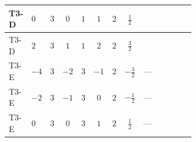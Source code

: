 \documentclass[8pt]{article}
\begin{document}
\begin{landscape}
\begin{longtable}{@{}llcccccc >{\raggedright\arraybackslash}p{0.21\linewidth} >{\raggedright\arraybackslash}p{0.21\linewidth} >{\raggedright\arraybackslash}p{0.21\linewidth}@{}}
\midrule
T3-D & $0$ & $3$ & $0$ & $1$ & $1$ & $2$ & $\frac{1}{2}$ & \scriptsize\adjustbox{max width=\linewidth}{$\begin{gathered} +2 {\lambda_{12}^{(1)}} {\lambda_{HS_2}^{(1)}}\end{gathered}$} & \scriptsize\adjustbox{max width=\linewidth}{$\begin{gathered} +6 {\lambda_1} {\lambda_{HS_1}^{(1)}}\end{gathered}$} & \scriptsize\adjustbox{max width=\linewidth}{$\begin{gathered} +4 {\lambda_{HS_1}^{(1)}}^2\end{gathered}$} \\
\midrule
T3-D & $2$ & $3$ & $1$ & $1$ & $2$ & $2$ & $\frac{3}{2}$ & \scriptsize\adjustbox{max width=\linewidth}{$\begin{gathered} +2 {\lambda_{12}^{(1)}} {\lambda_{HS_2}^{(1)}}\end{gathered}$} & \scriptsize\adjustbox{max width=\linewidth}{$\begin{gathered} +6 {\lambda_1} {\lambda_{HS_1}^{(1)}}\end{gathered}$} & \scriptsize\adjustbox{max width=\linewidth}{$\begin{gathered} +4 {\lambda_{HS_1}^{(1)}}^2\end{gathered}$} \\
\midrule
T3-E & $-4$ & $3$ & $-2$ & $3$ & $-1$ & $2$ & $-\frac{3}{2}$ & --- & \scriptsize\adjustbox{max width=\linewidth}{$\begin{gathered} +6 {\lambda_1} {\lambda_{HS_1}^{(1)}}\end{gathered}$} & \scriptsize\adjustbox{max width=\linewidth}{$\begin{gathered} +4 {\lambda_{HS_1}^{(1)}}^2\end{gathered}$} \\
\midrule
T3-E & $-2$ & $3$ & $-1$ & $3$ & $0$ & $2$ & $-\frac{1}{2}$ & --- & \scriptsize\adjustbox{max width=\linewidth}{$\begin{gathered} +6 {\lambda_1} {\lambda_{HS_1}^{(1)}}\end{gathered}$} & \scriptsize\adjustbox{max width=\linewidth}{$\begin{gathered} +4 {\lambda_{HS_1}^{(1)}}^2\end{gathered}$} \\
\midrule
T3-E & $0$ & $3$ & $0$ & $3$ & $1$ & $2$ & $\frac{1}{2}$ & --- & \scriptsize\adjustbox{max width=\linewidth}{$\begin{gathered} +6 {\lambda_1} {\lambda_{HS_1}^{(1)}}\end{gathered}$} & \scriptsize\adjustbox{max width=\linewidth}{$\begin{gathered} +4 {\lambda_{HS_1}^{(1)}}^2\end{gathered}$} \\

\end{longtable}
\end{landscape}
\end{document}
